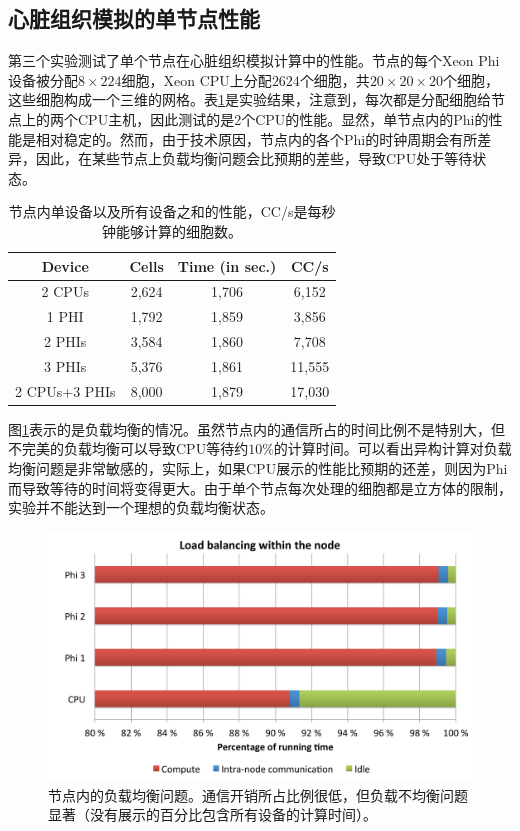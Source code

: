 \subsection{心脏组织模拟的单节点性能}
第三个实验测试了单个节点在心脏组织模拟计算中的性能。节点的每个Xeon Phi设备被分配$8\times224$细胞，Xeon CPU上分配$2624$个细胞，共$20\times20\times20$个细胞，这些细胞构成一个三维的网格。表\ref{tbl:perf1}是实验结果，注意到，每次都是分配细胞给节点上的两个CPU主机，因此测试的是2个CPU的性能。显然，单节点内的Phi的性能是相对稳定的。然而，由于技术原因，节点内的各个Phi的时钟周期会有所差异，因此，在某些节点上负载均衡问题会比预期的差些，导致CPU处于等待状态。

\begin{table}
\caption{节点内单设备以及所有设备之和的性能，CC/s是每秒钟能够计算的细胞数。}
\label{tbl:perf1}
\begin{center}
\begin{tabular}{c|ccc}
Device & Cells & Time (in sec.) & CC/s \\
\hline
2 CPUs	&	2,624	&	1,706	&	6,152	\\	
1 PHI	&	1,792	&	1,859	&	3,856	\\	
2 PHIs	&	3,584	&	1,860	&	7,708	\\	
3 PHIs	&	5,376	&	1,861	&	11,555	\\	
2 CPUs+3 PHIs	&	8,000	&	1,879	&	17,030	\\	
\end{tabular}
\end{center}
\end{table}

图\ref{loadbalance}表示的是负载均衡的情况。虽然节点内的通信所占的时间比例不是特别大，但不完美的负载均衡可以导致CPU等待约$10\%$的计算时间。可以看出异构计算对负载均衡问题是非常敏感的，实际上，如果CPU展示的性能比预期的还差，则因为Phi而导致等待的时间将变得更大。由于单个节点每次处理的细胞都是立方体的限制，实验并不能达到一个理想的负载均衡状态。

\begin{figure}
 \includegraphics[width=\linewidth]{figs/loadbalance.pdf}
  \caption{节点内的负载均衡问题。通信开销所占比例很低，但负载不均衡问题显著（没有展示的百分比包含所有设备的计算时间）。}
  \label{loadbalance}
\end{figure}

